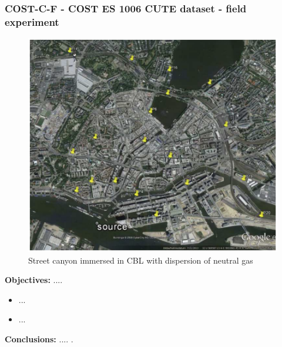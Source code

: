 \subsubsection{COST-C-F - COST ES 1006 CUTE dataset - field experiment}
    \begin{figure}[h!]
        \hypertarget{link:cost_c_f}{}
        \centering
        \includegraphics[scale=0.8]{imgs/cute_field_exp.png}
        \caption{Street canyon immersed in CBL with dispersion of neutral 
        gas}
    \end{figure}
    \textbf{Objectives:} ....\newline
    \begin{itemize}
        \item ...
        \item ...
    \end{itemize}
    \textbf{Conclusions:} .... .\newline

